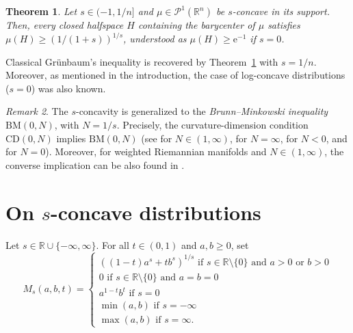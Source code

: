 \documentclass[sts]{imsart}
\newtheorem{theorem}{Theorem}[section]
\theoremstyle{definition}
\theoremstyle{remark}
\newtheorem{remark}[theorem]{Remark}
\newcommand{\R}{\mathbb{R}}
\newcommand{\e}{\mathrm{e}}
\newcommand{\CD}{\mathrm{CD}}
\begin{document}
\begin{theorem} \label{thm:Eucl}
Let $s\in (-1,1/n]$ and $\mu \in \mathcal{P}^1(\R^n)$ be $s$-concave in its support.
Then, every closed halfspace $H$ containing the barycenter of $\mu$ satisfies $\mu(H) \geq (1/(1+s))^{1/s}$, understood as $\mu(H) \ge \e^{-1}$ if $s=0$.
\end{theorem}


Classical Grünbaum's inequality is recovered by Theorem~\ref{thm:Eucl} with $s=1/n$.
Moreover, as mentioned in the introduction, the case of log-concave distributions ($s=0$) was also known.

\begin{remark}\label{rm:BM}
The $s$-concavity is generalized to the \emph{Brunn--Minkowski inequality} $\mathrm{BM}(0,N)$, with $N=1/s$.
Precisely, the curvature-dimension condition $\CD(0,N)$ implies $\mathrm{BM}(0,N)$ (see \cite[Proposition~2.1]{SturmII} for $N \in (1,\infty)$, \cite[Theorem~30.7]{Villani} for $N=\infty$, \cite[Theorem~4.8]{Oneg} for $N<0$,  and \cite[(3.9)]{Oneedle} for $N=0$).
Moreover, for weighted Riemannian manifolds and $N\in (1,\infty)$, the converse implication can be also found in \cite[Theorem~1.1]{magnabosco2024brunn}.
\end{remark}


\section{On $s$-concave distributions} \label{Sec:Euclidean}

Let $s\in\R\cup\{-\infty,\infty\}$. For all $t\in (0,1)$ and $a,b\geq 0$, set $$M_s(a,b,t)=\begin{cases} \left((1-t)a^s+tb^s\right)^{1/s} \textrm{ if } s\in \R\setminus\{0\} \textrm{ and } a>0 \textrm{ or } b>0 \\ 0 \textrm{ if } s\in \R\setminus\{0\} \textrm{ and } a=b=0 \\ a^{1-t}b^t \textrm{ if } s=0 \\ \min(a,b) \textrm{ if } s=-\infty \\ \max(a,b) \textrm{ if } s=\infty. \end{cases}$$
\end{document}
